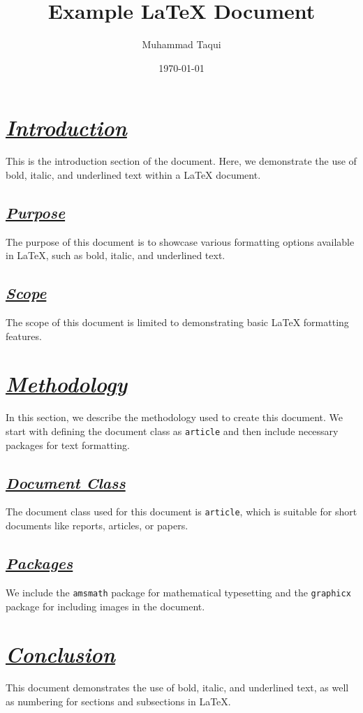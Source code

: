 \documentclass{article}
\begin{document}
\title{Example LaTeX Document}
\author{Muhammad Taqui}
\date{\today}
\maketitle

\section{\textbf{\textit{\underline{Introduction}}}}

This is the introduction section of the document. Here, we demonstrate the use of bold, italic, and underlined text within a LaTeX document.

\subsection{\textbf{\textit{\underline{Purpose}}}}

The purpose of this document is to showcase various formatting options available in LaTeX, such as bold, italic, and underlined text.

\subsection{\textbf{\textit{\underline{Scope}}}}

The scope of this document is limited to demonstrating basic LaTeX formatting features.

\section{\textbf{\textit{\underline{Methodology}}}}

In this section, we describe the methodology used to create this document. We start with defining the document class as \texttt{article} and then include necessary packages for text formatting.

\subsection{\textbf{\textit{\underline{Document Class}}}}

The document class used for this document is \texttt{article}, which is suitable for short documents like reports, articles, or papers.

\subsection{\textbf{\textit{\underline{Packages}}}}

We include the \texttt{amsmath} package for mathematical typesetting and the \texttt{graphicx} package for including images in the document.

\section{\textbf{\textit{\underline{Conclusion}}}}

This document demonstrates the use of bold, italic, and underlined text, as well as numbering for sections and subsections in LaTeX.
\end{document}
